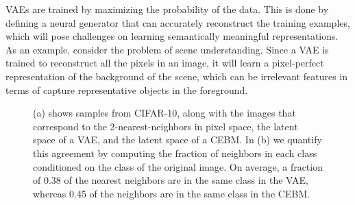 \documentclass[tablecaption=bottom,wcp]{jmlr} %
\begin{document}


VAEs are trained by maximizing the probability of the data. This is done by defining a neural generator that can accurately reconstruct the training examples, which will pose challenges on learning semantically meaningful representations. As an example, consider the problem of scene understanding. Since a VAE is trained to reconstruct all the pixels in an image, it will learn a pixel-perfect representation of the background of the scene, which can be irrelevant features in terms of capture representative objects in the foreground. 

\begin{figure}[!t]
\label{fig:cebm-knn-cifar10}
\centering
{}%
\vspace*{-1.5ex}
\caption{(a) shows samples from CIFAR-10, along with the images that correspond to the 2-nearest-neighbors in pixel space, the latent space of a VAE, and the latent space of a CEBM. In (b) we quantify this agreement by computing the fraction of neighbors in each class conditioned on the class of the original image. On average, a fraction of 0.38 of the nearest neighbors are in the same class in the VAE, whereas 0.45 of the neighbors are in the same class in the CEBM.}
\end{figure}

\end{document}

